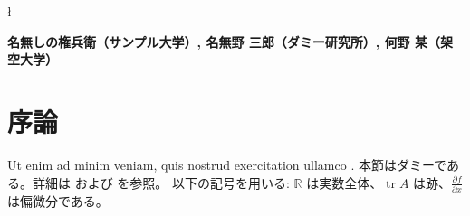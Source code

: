 \documentclass[a4j,11pt]{jarticle}
\numberwithin{equation}{section}
\newcommand{\R}{\mathbb{R}}
\newcommand{\pd}[2]{\frac{\partial #1}{\partial #2}}
\DeclareMathOperator{\tr}{tr}
\begin{document}
\l
\Large\bf
\boldmath

\thispagestyle{empty}
\vspace*{-15mm}

\vspace{15mm}

\begin{center}
{}

\baselineskip 18pt
\vspace{7mm}

{\bf 名無しの権兵衛（サンプル大学）, 名無野 三郎（ダミー研究所）, 何野 某（架空大学）}

\vspace{5mm}

\end{center}
\vspace{10mm}
\begin{center}
\begin{minipage}{14cm}
\baselineskip 16pt
\noindent
\begin{abstract}
\Large\bf
\boldmath

Lorem ipsum dolor sit amet, consectetur adipiscing elit, sed do eiusmod
tempor incididunt ut labore et dolore magna aliqua. 本稿はダミーテキストであり、
内容に意味はない。数式 $\alpha_s$ や $\bm{v}$ の扱いを確認するためのものである。

\end{abstract}
\end{minipage}
\end{center}

\vspace{0.5cm}

\section{序論}

Ut enim ad minim veniam, quis nostrud exercitation ullamco \cite{Dummy-1}.
本節はダミーである。詳細は \cite{Dummy-2} および \cite{Missing-Key} を参照。
以下の記号を用いる: $\R$ は実数全体、$\tr A$ は跡、$\pd{f}{x}$ は偏微分である。
\end{document}
